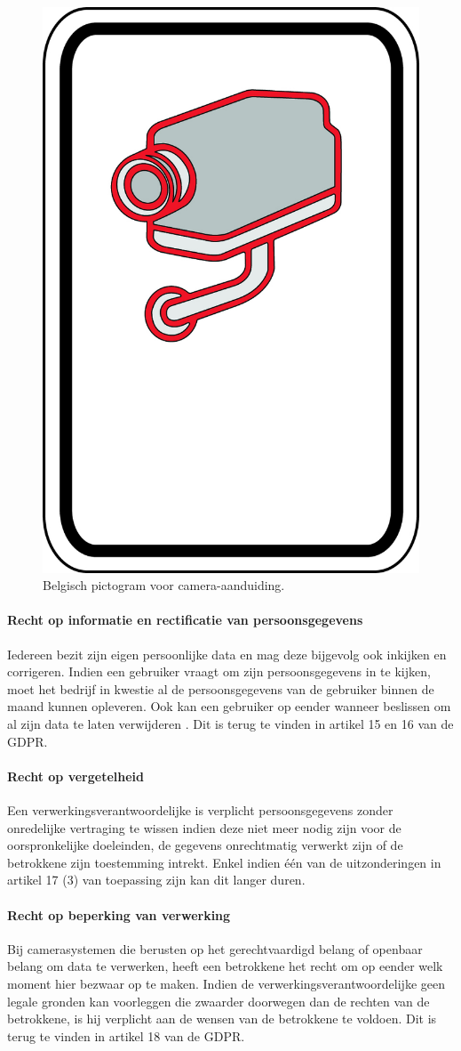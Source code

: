 \begin{figure}[h!]
	\centering
	\includegraphics[width=.5\linewidth]{img/anpr-aanduiding.png}
	\caption{Belgisch pictogram voor camera-aanduiding. \autocite{besafe2018picto}}
	\label{anpr-aanduiding}
\end{figure}

\paragraph{Recht op informatie en rectificatie van persoonsgegevens} 
Iedereen bezit zijn eigen persoonlijke data en mag deze bijgevolg ook inkijken en corrigeren. Indien een gebruiker vraagt om zijn persoonsgegevens in te kijken, moet het bedrijf in kwestie al de persoonsgegevens van de gebruiker binnen de maand kunnen opleveren. Ook kan een gebruiker op eender wanneer beslissen om al zijn data te laten verwijderen \autocite{avg2018privacy}. Dit is terug te vinden in artikel 15 en 16 van de GDPR.

\paragraph{Recht op vergetelheid}
Een verwerkingsverantwoordelijke is verplicht persoonsgegevens zonder onredelijke vertraging te wissen indien deze niet meer nodig zijn voor de oorspronkelijke doeleinden, de gegevens onrechtmatig verwerkt zijn of de betrokkene zijn toestemming intrekt. Enkel indien één van de uitzonderingen in artikel 17 (3) van toepassing zijn kan dit langer duren. \autocite{edpb2019guidelines}

\paragraph{Recht op beperking van verwerking}
Bij camerasystemen die berusten op het gerechtvaardigd belang of openbaar belang om data te verwerken, heeft een betrokkene het recht om op eender welk moment hier bezwaar op te maken. Indien de verwerkingsverantwoordelijke geen legale gronden kan voorleggen die zwaarder doorwegen dan de rechten van de betrokkene, is hij verplicht aan de wensen van de betrokkene te voldoen. Dit is terug te vinden in artikel 18 van de GDPR.

